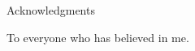 \thispagestyle{empty}

\vspace*{20mm}

\begin{center}
{ Acknowledgments}

To everyone who has believed in me.
\end{center}

\vspace{10mm}


\cleardoublepage{}
